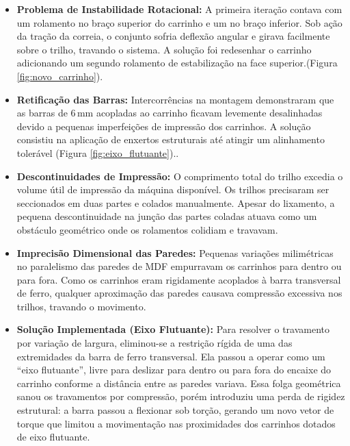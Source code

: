 \documentclass[11pt,a4paper]{article}
\begin{document}
\begin{itemize}
    \item \textbf{Problema de Instabilidade Rotacional:} A primeira iteração contava com um rolamento no braço superior do carrinho e um no braço inferior. Sob ação da tração da correia, o conjunto sofria deflexão angular e girava facilmente sobre o trilho, travando o sistema. A solução foi redesenhar o carrinho adicionando um segundo rolamento de estabilização na face superior.(Figura \ref{fig:novo_carrinho}).
    \item \textbf{Retificação das Barras:} Intercorrências na montagem demonstraram que as barras de $6\,\text{mm}$ acopladas ao carrinho ficavam levemente desalinhadas devido a pequenas imperfeições de impressão dos carrinhos. A solução consistiu na aplicação de enxertos estruturais até atingir um alinhamento tolerável (Figura \ref{fig:eixo_flutuante})..
    \item \textbf{Descontinuidades de Impressão:} O comprimento total do trilho excedia o volume útil de impressão da máquina disponível. Os trilhos precisaram ser seccionados em duas partes e colados manualmente. Apesar do lixamento, a pequena descontinuidade na junção das partes coladas atuava como um obstáculo geométrico onde os rolamentos colidiam e travavam.
    \item \textbf{Imprecisão Dimensional das Paredes:} Pequenas variações milimétricas no paralelismo das paredes de MDF empurravam os carrinhos para dentro ou para fora. Como os carrinhos eram rigidamente acoplados à barra transversal de ferro, qualquer aproximação das paredes causava compressão excessiva nos trilhos, travando o movimento.
    \item \textbf{Solução Implementada (Eixo Flutuante):} Para resolver o travamento por variação de largura, eliminou-se a restrição rígida de uma das extremidades da barra de ferro transversal. Ela passou a operar como um ``eixo flutuante'', livre para deslizar para dentro ou para fora do encaixe do carrinho conforme a distância entre as paredes variava. Essa folga geométrica sanou os travamentos por compressão, porém introduziu uma perda de rigidez estrutural: a barra passou a flexionar sob torção, gerando um novo vetor de torque que limitou a movimentação nas proximidades dos carrinhos dotados de eixo flutuante. 
\end{itemize}
\end{document}
